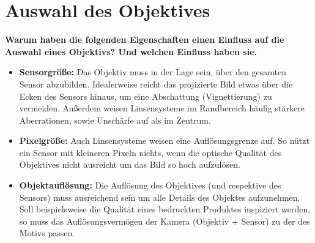 \documentclass[a4paper]{article}
\begin{document}
	\section{Auswahl des Objektives}
	\textbf{Warum haben die folgenden Eigenschaften einen Einfluss auf die Auswahl eines Objektivs?
		Und welchen Einfluss haben sie.}\\
	\begin{itemize}
		\item \textbf{Sensorgröße:} Das Objektiv muss in der Lage sein, über den gesamten Sensor abzubilden. Idealerweise reicht das projizierte Bild etwas über die Ecken des Sensors hinaus, um eine Abschattung (Vignettierung) zu vermeiden. Außerdem weisen Linsensysteme im Randbereich häufig stärkere Aberrationen, sowie Unschärfe auf als im Zentrum.\\
		\item \textbf{Pixelgröße:} Auch Linsensysteme weisen eine Auflösungsgrenze auf. So nützt ein Sensor mit kleineren Pixeln nichts, wenn die optische Qualität des Objektives nicht ausreicht um das Bild so hoch aufzulösen.\\
		\item \textbf{Objektauflösung:} Die Auflösung des Objektives (und respektive des Sensors) muss ausreichend sein um alle Details des Objektes aufzunehmen. Soll beispielsweise die Qualität eines bedruckten Produktes inspiziert werden, so muss das Auflösungsvermögen der Kamera (Objektiv + Sensor) zu der des Motivs passen.\\
	\end{itemize}

	\newpage
\end{document}
